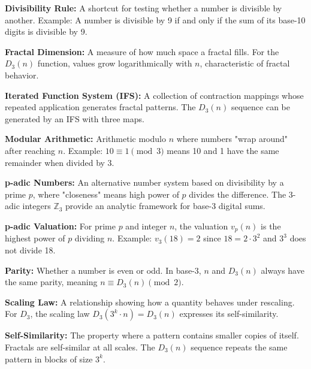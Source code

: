 \noindent\textbf{Divisibility Rule:} A shortcut for testing whether a number is divisible by another. Example: A number is divisible by 9 if and only if the sum of its base-10 digits is divisible by 9.

\noindent\textbf{Fractal Dimension:} A measure of how much space a fractal fills. For the $D_3(n)$ function, values grow logarithmically with $n$, characteristic of fractal behavior.

\noindent\textbf{Iterated Function System (IFS):} A collection of contraction mappings whose repeated application generates fractal patterns. The $D_3(n)$ sequence can be generated by an IFS with three maps.

\noindent\textbf{Modular Arithmetic:} Arithmetic modulo $n$ where numbers "wrap around" after reaching $n$. Example: $10 \equiv 1 \pmod{3}$ means 10 and 1 have the same remainder when divided by 3.

\noindent\textbf{p-adic Numbers:} An alternative number system based on divisibility by a prime $p$, where "closeness" means high power of $p$ divides the difference. The 3-adic integers $\mathbb{Z}_3$ provide an analytic framework for base-3 digital sums.

\noindent\textbf{p-adic Valuation:} For prime $p$ and integer $n$, the valuation $v_p(n)$ is the highest power of $p$ dividing $n$. Example: $v_3(18) = 2$ since $18 = 2 \cdot 3^2$ and $3^3$ does not divide 18.

\noindent\textbf{Parity:} Whether a number is even or odd. In base-3, $n$ and $D_3(n)$ always have the same parity, meaning $n \equiv D_3(n) \pmod{2}$.

\noindent\textbf{Scaling Law:} A relationship showing how a quantity behaves under rescaling. For $D_3$, the scaling law $D_3(3^k \cdot n) = D_3(n)$ expresses its self-similarity.

\noindent\textbf{Self-Similarity:} The property where a pattern contains smaller copies of itself. Fractals are self-similar at all scales. The $D_3(n)$ sequence repeats the same pattern in blocks of size $3^k$.


